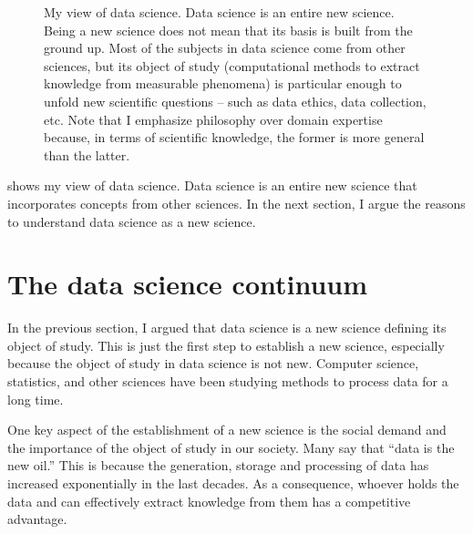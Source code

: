 \begin{figure}
  \centering
  \caption{
    My view of data science.
    Data science is an entire new science.  Being a new science
    does not mean that its basis is built from the ground up.  Most of the subjects in
    data science come from other sciences, but its object of study (computational methods
    to extract knowledge from measurable phenomena) is particular enough to unfold
    new scientific questions -- such as data ethics, data collection, etc.
    Note that I emphasize philosophy over domain expertise because, in terms
    of scientific knowledge, the former is more general than the latter.
  }
  \label{fig:myview}
\end{figure}

 shows my view of data science.  Data science is an entire new science
that incorporates concepts from other sciences.  In the next section, I argue the reasons
to understand data science as a new science.

\section{The data science continuum}

In the previous section, I argued that data science is a new science defining its object
of study.  This is just the first step to establish a new science, especially because the
object of study in data science is not new.  Computer science, statistics, and other
sciences have been studying methods to process data for a long time.

One key aspect of the establishment of a new science is the social demand and the
importance of the object of study in our society.  Many say that ``data is the new oil.''
This is because the generation, storage and processing of data has increased exponentially
in the last decades.  As a consequence, whoever holds the data and can effectively extract
knowledge from them has a competitive advantage.

